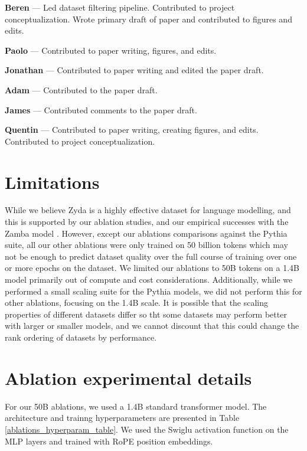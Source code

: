\documentclass{article}
\begin{document}
\textbf{Beren} — Led dataset filtering pipeline. Contributed to project conceptualization. Wrote primary draft of paper and contributed to figures and edits.

\textbf{Paolo} — Contributed to paper writing, figures, and edits.

\textbf{Jonathan} — Contributed to paper writing and edited the paper draft.

\textbf{Adam} — Contributed to the paper draft.

\textbf{James} — Contributed comments to the paper draft.


\textbf{Quentin} — Contributed to paper writing, creating figures, and edits. Contributed to project conceptualization.

\section{Limitations}

While we believe Zyda is a highly effective dataset for language modelling, and this is supported by our ablation studies, and our empirical successes with the Zamba model \citep{glorioso2024zamba}. However, except our ablations comparisons against the Pythia suite, all our other ablations were only trained on 50 billion tokens which may not be enough to predict dataset quality over the full course of training over one or more epochs on the dataset. We limited our ablations to 50B tokens on a 1.4B model primarily out of compute and cost considerations. Additionally, while we performed a small scaling suite for the Pythia models, we did not perform this for other ablations, focusing on the 1.4B scale. It is possible that the scaling properties of different datasets differ so tht some datasets may perform better with larger or smaller models, and we cannot discount that this could change the rank ordering of datasets by performance.



\section{Ablation experimental details}

For our 50B ablations, we used a 1.4B standard transformer model. The architecture and trainng hyperparameters are presented in Table \ref{ablations_hyperparam_table}. We used the Swiglu activation function on the MLP layers and trained with RoPE position embeddings. 
\end{document}
